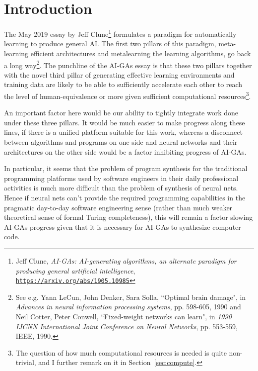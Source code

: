 \documentclass{article}
\begin{document}
\tableofcontents

\section{Introduction}

The May 2019 essay by Jeff Clune\footnote{Jeff Clune, {\em AI-GAs: AI-generating algorithms, 
an alternate paradigm for producing general artificial intelligence}, 
\href{https://arxiv.org/abs/1905.10985}{\tt https://arxiv.org/abs/1905.10985}
} formulates a paradigm for automatically learning
to produce general AI. The first two pillars of this paradigm, meta-learning efficient
architectures and metalearning the learning algorithms, go back a long way\footnote{See e.g.
Yann LeCun, John Denker, Sara Solla, ``Optimal brain damage", in {\em Advances in neural
information processing systems}, pp. 598-605, 1990 and Neil Cotter, Peter Conwell, ``Fixed-weight networks can learn", in {\em 1990 IJCNN International
Joint Conference on Neural Networks}, pp. 553-559, IEEE, 1990.}. The punchline of the AI-GAs essay is 
that these two pillars together with the novel third pillar of generating effective learning environments
and training data are likely to be able to sufficiently accelerate each
other to reach the level of human-equivalence or more given sufficient computational resources\footnote{The question of
how much computational resources is needed is quite non-trivial, and I further remark on it
in Section~\ref{sec:compute}.}.

An important factor here would be our ability to tightly integrate work done under these three pillars.
It would be much easier to make progress along these lines, if there is a unified platform suitable for this work, 
whereas a disconnect
between algorithms and programs on one side and neural networks and their architectures on the other side would be a factor inhibiting
progress of AI-GAs. 

In particular, it seems that the problem of program synthesis for the traditional programming
platforms used by software engineers in their daily professional activities
is much more difficult than the problem of synthesis of neural nets.
Hence if neural nets can't provide the required programming capabilities in the pragmatic day-to-day
software engineering sense (rather than much weaker theoretical sense of formal Turing completeness),
this will remain a factor slowing AI-GAs progress given that it is necessary for AI-GAs to synthesize computer code.
\end{document}
